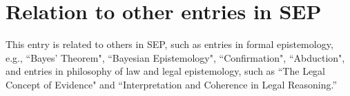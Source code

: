 \documentclass{article}
\begin{document}

















































\section{Relation to other entries in SEP}


This entry is related to others in SEP, such as entries in formal epistemology, e.g., ``Bayes' Theorem", ``Bayesian Epistemology", ``Confirmation",  ``Abduction", and entries in philosophy of law and legal epistemology, such as 
``The Legal Concept of Evidence" and ``Interpretation and Coherence in Legal Reasoning.''








%

\end{document}
